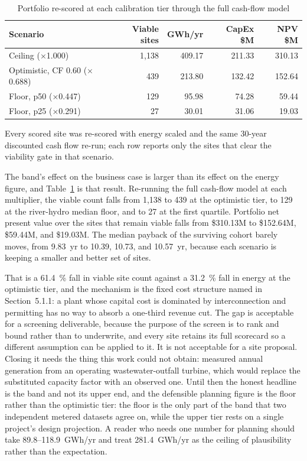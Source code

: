 \documentclass[12pt,letterpaper]{report}
\begin{document}
\begin{table}[htbp]
\centering
\caption{Portfolio re-scored at each calibration tier through the full cash-flow
model}
\label{tab:rescore}
\footnotesize
\begin{tabular}{@{}lrrrr@{}}
\toprule
Scenario & Viable sites & GWh/yr & CapEx \$M & NPV \$M \\
\midrule
Ceiling ($\times$1.000)          & 1{,}138 & 409.17 & 211.33 & 310.13 \\
Optimistic, CF 0.60 ($\times$0.688) & 439  & 213.80 & 132.42 & 152.64 \\
Floor, p50 ($\times$0.447)       & 129     & 95.98  & 74.28  & 59.44  \\
Floor, p25 ($\times$0.291)       & 27      & 30.01  & 31.06  & 19.03  \\
\bottomrule
\end{tabular}

\vspace{0.4em}
{\footnotesize Every scored site was re-scored with energy scaled and the same
30-year discounted cash flow re-run; each row reports only the sites that clear
the viability gate in that scenario.}
\end{table}

The band's effect on the business case is larger than its effect on the energy
figure, and Table~\ref{tab:rescore} is that result. Re-running the full cash-flow
model at each multiplier, the viable count falls from 1{,}138 to 439 at the
optimistic tier, to 129 at the river-hydro median floor, and to 27 at the first
quartile. Portfolio net present value over the sites that remain viable falls from
\$310.13M to \$152.64M, \$59.44M, and \$19.03M. The median payback of the
surviving cohort barely moves, from 9.83~yr to 10.39, 10.73, and 10.57~yr, because
each scenario is keeping a smaller and better set of sites.

That is a 61.4~\% fall in viable site count against a 31.2~\% fall in energy at
the optimistic tier, and the mechanism is the fixed cost structure named in
Section~5.1.1: a plant whose capital cost is dominated by interconnection and
permitting has no way to absorb a one-third revenue cut. The gap is acceptable for
a screening deliverable, because the purpose of the screen is to rank and bound
rather than to underwrite, and every site retains its full scorecard so a
different assumption can be applied to it. It is not acceptable for a site
proposal. Closing it needs the thing this work could not obtain: measured annual
generation from an operating wastewater-outfall turbine, which would replace the
substituted capacity factor with an observed one. Until then the honest headline
is the band and not its upper end, and the defensible planning figure is the
floor rather than the optimistic tier: the floor is the only part of the band
that two independent metered datasets agree on, while the upper tier rests on a
single project's design projection. A reader who needs one number for planning
should take 89.8--118.9~GWh/yr and treat 281.4~GWh/yr as the ceiling of
plausibility rather than the expectation.
\end{document}

